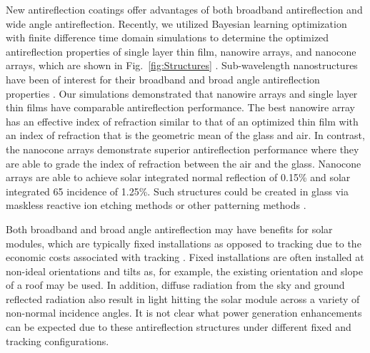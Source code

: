 \documentclass[preprint,12pt]{elsarticle}
\begin{document}
New antireflection coatings offer advantages of both broadband antireflection and wide angle antireflection.  
Recently, we utilized Bayesian learning optimization with finite difference time domain simulations to determine the optimized antireflection properties of single layer thin film, nanowire arrays, and nanocone arrays, which are shown in Fig.~\ref{fig:Structures} \cite{Haghanifar:20}. 
Sub-wavelength nanostructures have been of interest for their broadband and broad angle antireflection properties
\cite{Han:19,Haghanifar:20nov}.
Our simulations demonstrated that nanowire arrays and single layer thin films have comparable antireflection performance.  
The best nanowire array has an effective index of refraction similar to that of an optimized thin film with 
an index of refraction that is the geometric mean of the glass and air.  
In contrast, the nanocone arrays demonstrate superior antireflection performance where they are able to 
grade the index of refraction between the air and the glass.  
Nanocone arrays are able to achieve solar integrated normal reflection of 0.15\% and 
solar integrated 65 \degree incidence of 1.25\%.  Such structures could be created in glass via maskless reactive ion etching methods 
\cite{Haghanifar:19,Haghanifar:17} or other patterning methods \cite{Infante:13}.

Both broadband and broad angle antireflection may have benefits for solar modules, which are typically fixed installations as opposed to tracking 
due to the economic costs associated with tracking \cite{Bolinger:20}.  Fixed installations are often installed at non-ideal orientations and tilts as, for
example, the existing orientation and slope of a roof may be used. In addition, diffuse radiation
from the sky and ground reflected radiation also result in light hitting the solar module across a variety of non-normal incidence angles.
It is not clear what power generation enhancements can be expected due to these antireflection structures under different fixed and tracking configurations.  
\end{document}
